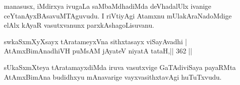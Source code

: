 \begin{artha}
manasusx, iMdirxya ivugaLa saMbaMdhadiMda deVhadalUlx ivanige ceYtanAyxBAsavuMTAguvudu. I riVtiyAgi Atamxnu mUlakAraNadoMdige elAlx kAyaR vasutxvanunx parxkAshagoLisuvanu.
\end{artha}

\begin{shl}
swkaSxmXyXsayx tAratameyxVna sithxtasayx viSayAvadhi | \\
AtAmxBimAnadhiVH puMsAM jAyateV niyatA tataH,\hfill ||  362 ||  
\end{shl}

\begin{artha}
sUkaSxmXteya tAratamayxdiMda iruva vasutxvige GaTAdiviSaya payaRMta AtAmxBimAna budidhxyu mAnavarige vayxvasithxtavAgi huTuTxvudu.
\end{artha}
